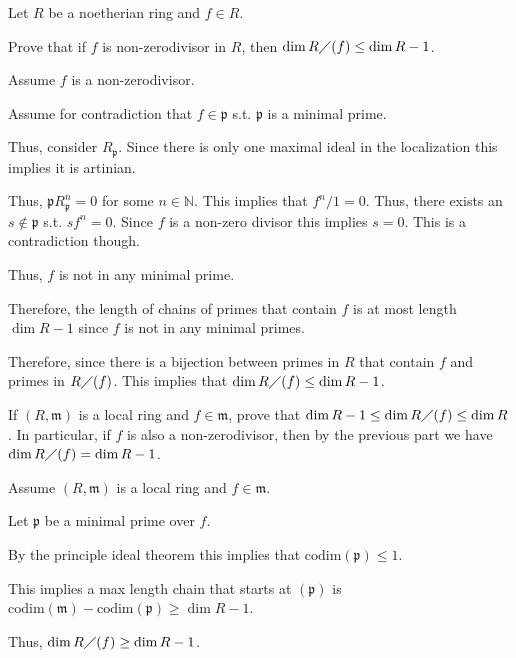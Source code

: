 \documentclass[12pt, letterpaper]{article}
\newcommand{\N}{\mathbb{N}}
\newcommand{\p}{\mathfrak{p}}
\newcommand{\mf}[1]{\mathfrak{#1}}
\begin{document}
\begin{problem}{}
    Let $R$ be a noetherian ring and $f \in R$.
\end{problem}
\begin{subproblem}{}
    Prove that if $f$ is non-zerodivisor in $R$, then $\dim R \diagup (f) \leq \dim R -1$.
\end{subproblem}
\begin{problemproof}
    Assume $f$ is a non-zerodivisor.

    Assume for contradiction that $f \in \p$ s.t. $\p$ is a minimal prime.

    Thus, consider $R_\p$. Since there is only one maximal ideal in the localization this implies it is artinian.

    Thus, $\p R_\p^n =0$ for some $n \in \N$. This implies that $f^n/1 =0$. Thus, there exists an $s \notin \p$ s.t. $sf^n=0$. Since $f$ is a non-zero divisor this implies $s=0$. This is a contradiction though.

    Thus, $f$ is not in any minimal prime.

    Therefore, the length of chains of primes that contain $f$ is at most length $\dim R - 1$ since $f$ is not in any minimal primes.

    Therefore, since there is a bijection between primes in $R$ that contain $f$ and primes in $R \diagup (f)$. This implies that $\dim R \diagup (f) \leq \dim R - 1$.
\end{problemproof}

\begin{subproblem}{}
    If $(R, \mf{m})$ is a local ring and $f \in \mf{m}$, prove that $\dim R-1 \leq \dim R \diagup (f) \leq \dim R$.
In particular, if $f$ is also a non-zerodivisor, then by the previous part we have
$\dim R \diagup (f) = \dim R-1$.
\end{subproblem}
\begin{problemproof}
    Assume $(R, \mf{m})$ is a local ring and $f \in \mf{m}$.

    Let $\p$ be a minimal prime over $f$.

    By the principle ideal theorem this implies that $\mathrm{codim}(\p) \leq 1$.

    This implies a max length chain that starts at $(\p)$ is $\mathrm{codim}(\mf{m})-\mathrm{codim}(\mf{\p}) \geq \dim R - 1$.

    Thus, $\dim R \diagup (f) \geq \dim R - 1$.
\end{problemproof}
\end{document}
